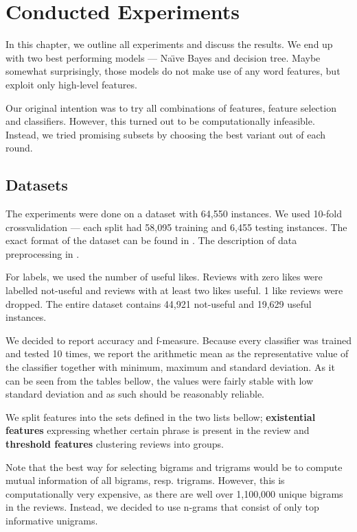 \chapter{Conducted Experiments}\label{chap:exp}

In this chapter, we outline all experiments and discuss the results.
We end up with two best performing models --- Na\"{\i}ve Bayes and decision tree.
Maybe somewhat surprisingly, those models do not make use of any word features,
but exploit only high-level features.

Our original intention was to try all combinations of features, feature selection and classifiers.
However, this turned out to be computationally infeasible.
Instead, we tried promising subsets by choosing the best variant out of each round.

\section{Datasets}

The experiments were done on a dataset with 64,550 instances.
We used 10-fold crossvalidation --- each split had
58,095 training and 6,455 testing instances.
The exact format of the dataset can be found in .
The description of data preprocessing in .

For labels, we used the number of useful likes.
Reviews with zero likes were labelled not-useful and
reviews with at least two likes useful.
1 like reviews were dropped.
The entire dataset contains 44,921 not-useful and
19,629 useful instances.

We decided to report accuracy and f-measure.
Because every classifier was trained and tested 10 times,
we report the arithmetic mean as the representative value of the classifier
together with minimum, maximum and standard deviation.
As it can be seen from the tables bellow, 
the values were fairly stable with low standard deviation and
as such should be reasonably reliable.

We split features into the sets defined in the two lists bellow;
\textbf{existential features} expressing whether certain phrase is present in the review and
\textbf{threshold features} clustering reviews into groups.

Note that the best way for selecting bigrams and trigrams would be to compute mutual information of all bigrams, resp. trigrams.
However, this is computationally very expensive, as there are well over 1,100,000 unique bigrams in the reviews.
Instead, we decided to use n-grams that consist of only top informative unigrams.

